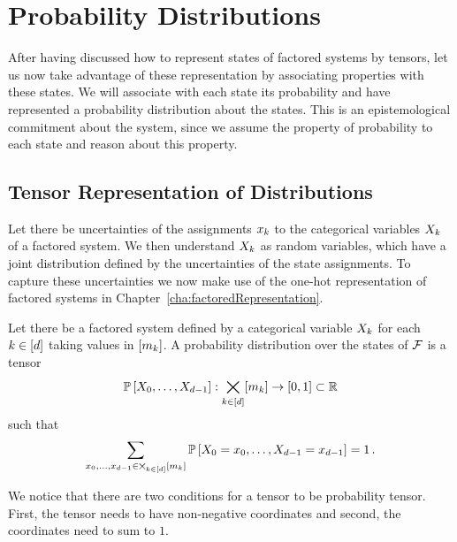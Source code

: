 \section{Probability Distributions}\label{cha:probDecomposition}

After having discussed how to represent states of factored systems by tensors, let us now take advantage of these representation by associating properties with these states.
We will associate with each state its probability and have represented a probability distribution about the states.
This is an epistemological commitment about the system, since we assume the property of probability to each state and reason about this property.




\subsection{Tensor Representation of Distributions}

Let there be uncertainties of the assignments $x_{k}$ to the categorical variables $X_{k}$ of a factored system.
We then understand $X_{k}$ as random variables, which have a joint distribution defined by the uncertainties of the state assignments.
To capture these uncertainties we now make use of the one-hot representation of factored systems in Chapter~\ref{cha:factoredRepresentation}.

\begin{definition} %
	Let there be a factored system defined by a categorical variable $X_{k}$ for each $k\in[d]$ taking values in $[m_{k}]$. 
	A probability distribution over the states of $\mathcal{F}$ is a tensor
		\[ \mathbb{P}\left[X_{0},\ldots,X_{d-1}\right] : \bigtimes_{k\in[d]}[m_{k}] \rightarrow [0, 1] \subset \mathbb{R} \]
	such that
		\[ \sum_{x_{0},\ldots,x_{d-1}\in\bigtimes_{k\in[d]}[m_{k}]} \mathbb{P}\left[X_{0}=x_{0},\ldots,X_{d-1}=x_{d-1}\right] = 1 \, . \]
\end{definition}



We notice that there are two conditions for a tensor to be probability tensor.
First, the tensor needs to have non-negative coordinates and second, the coordinates need to sum to $1$.

